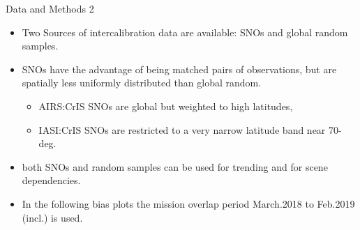 \documentclass[10pt,t]{beamer}
\begin{document}
\begin{frame}{Data and Methods 2}

  \begin{itemize}
  \item Two Sources of intercalibration data are available: SNOs and global random samples.
  \item SNOs have the advantage of being matched pairs of observations, but are spatially less uniformly distributed than global random.
    \begin{itemize}
    \item AIRS:CrIS SNOs are global but weighted to high latitudes,
    \item IASI:CrIS SNOs are restricted to a very narrow latitude band near 70-deg.
    \end{itemize}
  \item both SNOs and random samples can be used for trending and for scene dependencies.
  \item In the following bias plots the mission overlap period March.2018 to Feb.2019 (incl.) is used.
    
  \end{itemize}
\end{frame}
\end{document}
